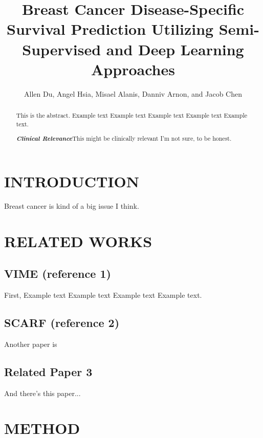 \documentclass[letterpaper, 10 pt, conference]{ieeeconf}  %
\title{\LARGE \bf
Breast Cancer Disease-Specific Survival Prediction Utilizing Semi-Supervised and Deep Learning Approaches
}
\author{Allen Du,
Angel Hsia, 
Misael Alanis, 
Danniv Arnon, and
Jacob Chen%
}
\begin{document}
\maketitle
\thispagestyle{empty}
\pagestyle{empty}


\begin{abstract}

This is the abstract. Example text Example text Example text Example text Example text.

{\textbf{\textit{Clinical Relevance}}}\textemdash This might be clinically relevant I'm not sure, to be honest.

\end{abstract}


\section{INTRODUCTION}

Breast cancer is kind of a big issue I think.

\section{RELATED WORKS}

\subsection{VIME (reference 1)}

First, Example text Example text Example text Example text.

\subsection{SCARF (reference 2)}

Another paper is

\subsection{Related Paper 3}

And there's this paper...



\section{METHOD}
\end{document}
